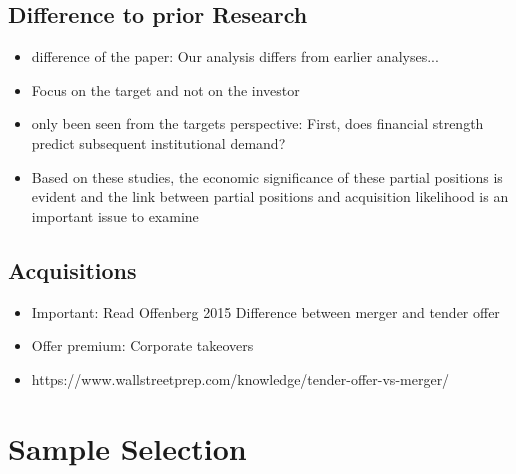 \documentclass[12pt]{article}
\begin{document}
\subsection{Difference to prior Research}

    \begin{itemize}

        \item difference of the paper: Our analysis differs from earlier analyses...\citep{Brigida2012}

        \item Focus on the target and not on the investor 

        \item only been seen from the targets perspective: First, does financial strength predict subsequent institutional demand? \citep{Choi2012}

        \item Based on these studies, the economic significance of these partial positions is evident and the link between partial positions and acquisition likelihood is an important issue to examine \citep{Akhigbe2007}
    \end{itemize}

\subsection{Acquisitions}

\begin{itemize}
    \item Important: Read Offenberg 2015 Difference between merger and tender offer 
    \item Offer premium: Corporate takeovers \citep{Mitchell2011}
    \item https://www.wallstreetprep.com/knowledge/tender-offer-vs-merger/
\end{itemize}
\section{Sample Selection}
\end{document}
